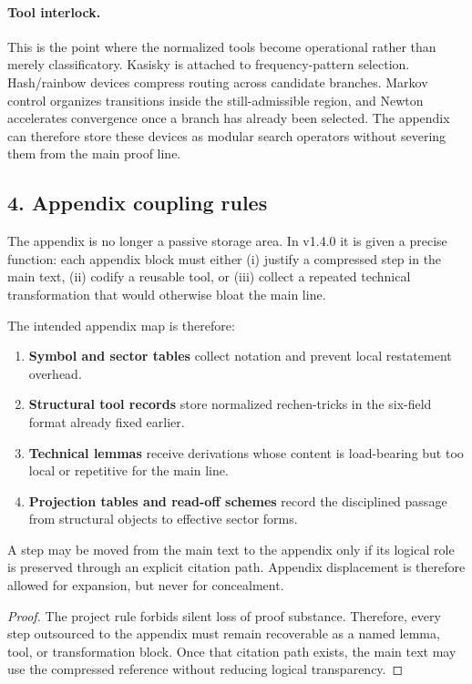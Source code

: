 \paragraph{Tool interlock.}
This is the point where the normalized tools become operational rather than
merely classificatory. Kasisky is attached to frequency-pattern selection.
Hash/rainbow devices compress routing across candidate branches. Markov control
organizes transitions inside the still-admissible region, and Newton
accelerates convergence once a branch has already been selected. The appendix
can therefore store these devices as modular search operators without severing
them from the main proof line.

\subsection*{4. Appendix coupling rules}
The appendix is no longer a passive storage area. In v1.4.0 it is given a
precise function: each appendix block must either (i) justify a compressed step
in the main text, (ii) codify a reusable tool, or (iii) collect a repeated
technical transformation that would otherwise bloat the main line.

The intended appendix map is therefore:
\begin{enumerate}[leftmargin=2em]
  \item \textbf{Symbol and sector tables} collect notation and prevent local
  restatement overhead.
  \item \textbf{Structural tool records} store normalized rechen-tricks in the
  six-field format already fixed earlier.
  \item \textbf{Technical lemmas} receive derivations whose content is
  load-bearing but too local or repetitive for the main line.
  \item \textbf{Projection tables and read-off schemes} record the disciplined
  passage from structural objects to effective sector forms.
\end{enumerate}

\begin{proposition}
\label{prop:appendix-transfer}
A step may be moved from the main text to the appendix only if its logical role
is preserved through an explicit citation path. Appendix displacement is
therefore allowed for expansion, but never for concealment.
\end{proposition}

\begin{proof}
The project rule forbids silent loss of proof substance. Therefore, every step
outsourced to the appendix must remain recoverable as a named lemma, tool, or
transformation block. Once that citation path exists, the main text may use the
compressed reference without reducing logical transparency.
\end{proof}

